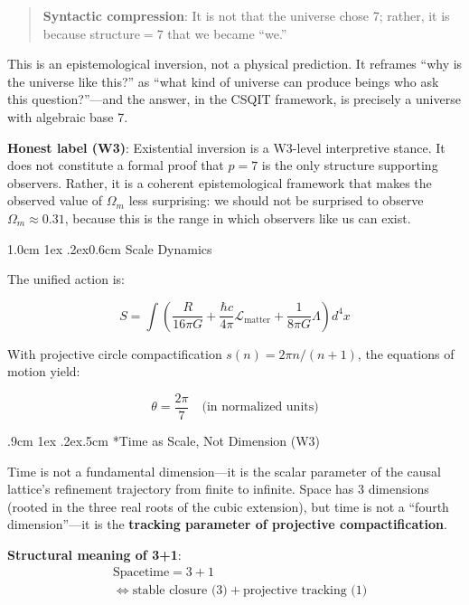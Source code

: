 \documentclass[aps,prd,twocolumn,nofootinbib,floatfix]{revtex4-2}
\makeatletter
\def\section{%
  \@startsection{section}{1}{\z@}
    {1.0cm \@plus1ex \@minus .2ex}{0.6cm}
    {\normalfont\large\bfseries\centering}%
}
\def\subsection{%
  \@startsection{subsection}{2}{\z@}
    {.9cm \@plus1ex \@minus .2ex}{.5cm}
    {\normalfont\normalsize\bfseries\centering}%
}
\makeatother
\begin{document}
\begin{quote}
\textbf{Syntactic compression}: It is not that the universe chose 7; rather, it is because structure$=7$ that we became ``we.''
\end{quote}

This is an epistemological inversion, not a physical prediction. It reframes ``why is the universe like this?'' as ``what kind of universe can produce beings who ask this question?''---and the answer, in the CSQIT framework, is precisely a universe with algebraic base 7.

\medskip
\noindent\textbf{Honest label (W3)}: Existential inversion is a W3-level interpretive stance. It does not constitute a formal proof that $p=7$ is the only structure supporting observers. Rather, it is a coherent epistemological framework that makes the observed value of $\Omega_m$ less surprising: we should not be surprised to observe $\Omega_m \approx 0.31$, because this is the range in which observers like us can exist.

\section{Scale Dynamics}

The unified action is:

\[
S = \int \left( \frac{R}{16\pi G} + \frac{\hbar c}{4\pi} \mathcal{L}_\text{matter} + \frac{1}{8\pi G} \Lambda \right) d^4x
\]

With projective circle compactification $s(n) = 2\pi n/(n+1)$, the equations of motion yield:

\[
\theta = \frac{2\pi}{7} \quad \text{(in normalized units)}
\]

\subsection*{Time as Scale, Not Dimension (W3)}

Time is not a fundamental dimension---it is the scalar parameter of the causal lattice's refinement trajectory from finite to infinite. Space has 3 dimensions (rooted in the three real roots of the cubic extension), but time is not a ``fourth dimension''---it is the \textbf{tracking parameter of projective compactification}.

\textbf{Structural meaning of 3+1}:
\[
\begin{aligned}
&\text{Spacetime} = 3 + 1 \\
&\iff \text{stable closure (3)} + \text{projective tracking (1)}
\end{aligned}
\]
\end{document}
